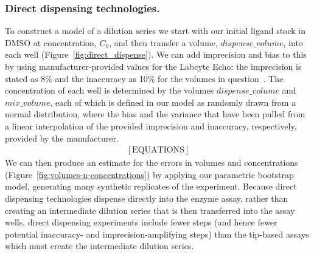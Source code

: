 \documentclass[aps,pre,twocolumn,nofootinbib,superscriptaddress,linenumbers]{revtex4-1}
\begin{document}
\subsubsection*{Direct dispensing technologies.}

To construct a model of a dilution series we start with our initial ligand stock in DMSO at concentration, $C_0$, and then transfer a volume, $dispense\_volume$, into each well (Figure~\ref{fig:direct_dispense}). 
We can add imprecision and bias to this by using manufacturer-provided values for the Labcyte Echo: the imprecision is stated as 8\% and the inaccuracy as 10\% for the volumes in question~\cite{_echo_2011}. 
The concentration of each well is determined by the volumes $dispense\_volume$ and $mix\_volume$, each of which is defined in our model as randomly drawn from a normal distribution, where the bias and the variance that have been pulled from a linear interpolation of the provided imprecision and inaccuracy, respectively, provided by the manufacturer.
\begin{eqnarray}
\mathrm{[EQUATIONS]}
\end{eqnarray}
We can then produce an estimate for the errors in volumes and concentrations (Figure~\ref{fig:volumes-n-concentrations}) by applying our parametric bootstrap model, generating many synthetic replicates of the experiment.
Because direct dispensing technologies dispense directly into the enzyme assay, rather than creating an intermediate dilution series that is then transferred into the assay wells, direct dispensing experiments include fewer steps (and hence fewer potential inaccuracy- and imprecision-amplifying steps) than the tip-based assays which must create the intermediate dilution series.
\end{document}
